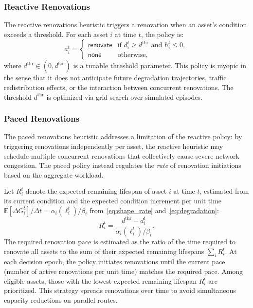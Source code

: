 \documentclass[3p, twocolumn]{elsarticle}
\begin{document}
\subsubsection{Reactive Renovations}

The reactive renovations heuristic triggers a renovation when an asset's condition exceeds a threshold. For each asset $i$ at time $t$, the policy is:
\begin{equation}
    a_i^t = 
    \begin{cases}
        \textsf{renovate} & \text{if } d_i^t \geq d^{\text{thr}} \text{ and } h_i^t \leq 0, \\
        \textsf{none} & \text{otherwise},
    \end{cases}
    \label{eq:reactive}
\end{equation}
where $d^{\text{thr}} \in (0, d^{\text{fail}})$ is a tunable threshold parameter. This policy is myopic in the sense that it does not anticipate future degradation trajectories, traffic redistribution effects, or the interaction between concurrent renovations. The threshold $d^{\text{thr}}$ is optimized via grid search over simulated episodes.

\subsubsection{Paced Renovations}

The paced renovations heuristic addresses a limitation of the reactive policy: by triggering renovations independently per asset, the reactive heuristic may schedule multiple concurrent renovations that collectively cause severe network congestion. The paced policy instead regulates the \emph{rate} of renovation initiations based on the aggregate workload.

Let $R_i^t$ denote the expected remaining lifespan of asset $i$ at time $t$, estimated from its current condition and the expected condition increment per unit time $\mathbb{E}[\Delta G_i^t]/\Delta t = \alpha_i(\ell_i^t)/\beta_i$ from~\eqref{eq:shape_rate} and~\eqref{eq:degradation}:
\begin{equation}
    R_i^t = \frac{d^{\text{thr}} - d_i^t}{\alpha_i(\ell_i^t) / \beta_i}.
    \label{eq:remaining_life}
\end{equation}
The required renovation pace is estimated as the ratio of the time required to renovate all assets to the sum of their expected remaining lifespans $\sum_{i} R_i^t$. At each decision epoch, the policy initiates renovations until the current pace (number of active renovations per unit time) matches the required pace. Among eligible assets, those with the lowest expected remaining lifespan $R_i^t$ are prioritized. This strategy spreads renovations over time to avoid simultaneous capacity reductions on parallel routes.
\end{document}
